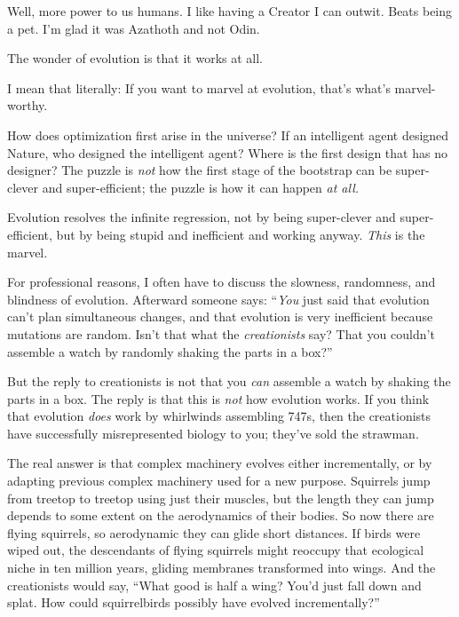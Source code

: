 {{
 Well, more power to us humans. I like having a Creator I can
outwit. Beats being a pet. I'm glad it was Azathoth and
not Odin.}

\myendsectiontext


\bigskip


{
 The wonder of evolution is that it works at all. }

{
 I mean that literally: If you want to marvel at evolution,
that's what's marvel-worthy.}

{
 How does optimization first arise in the universe? If an
intelligent agent designed Nature, who designed the intelligent agent?
Where is the first design that has no designer? The puzzle is
\textit{not} how the first stage of the bootstrap can be super-clever
and super-efficient; the puzzle is how it can happen \textit{at all.}}

{
 Evolution resolves the infinite regression, not by being
super-clever and super-efficient, but by being stupid and inefficient
and working anyway. \textit{This} is the marvel.}

{
 For professional reasons, I often have to discuss the slowness,
randomness, and blindness of evolution. Afterward someone says:
``\textit{You} just said that evolution
can't plan simultaneous changes, and that evolution is
very inefficient because mutations are random. Isn't
that what the \textit{creationists} say? That you
couldn't assemble a watch by randomly shaking the parts
in a box?''}

{
 But the reply to creationists is not that you \textit{can}
assemble a watch by shaking the parts in a box. The reply is that this
is \textit{not} how evolution works. If you think that evolution
\textit{does} work by whirlwinds assembling 747s, then the creationists
have successfully misrepresented biology to you;
they've sold the strawman.}

{
 The real answer is that complex machinery evolves either
incrementally, or by adapting previous complex machinery used for a new
purpose. Squirrels jump from treetop to treetop using just their
muscles, but the length they can jump depends to some extent on the
aerodynamics of their bodies. So now there are flying squirrels, so
aerodynamic they can glide short distances. If birds were wiped out,
the descendants of flying squirrels might reoccupy that ecological
niche in ten million years, gliding membranes transformed into wings.
And the creationists would say, ``What good is half a
wing? You'd just fall down and splat. How could
squirrelbirds possibly have evolved incrementally?''}

}
